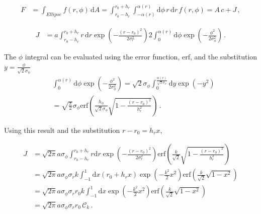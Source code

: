 \documentclass[a4paper]{scrartcl}
\begin{document}
\begin{align}
  F & = \int_{Ellipse} f(r, \phi) \, \mathrm{d}A                                                
    = \int_{r_0 - h_r}^{r_0 + h_r} \int_{-\alpha(r)}^{\alpha(r)} \mathrm{d}\phi \, r \,\mathrm{d}r \, f(r, \phi)
    = A \,c + J \,,
\end{align}

\begin{align}
  J & = a \int_{r_0 - h_r}^{r_0 + h_r} r \,\mathrm{d}r \exp\left( - \frac{(r-r_0)^2}{2 \sigma_r^2} \right)
  2 \int_0^{\alpha(r)} \mathrm{d}\phi \exp\left( - \frac{\phi^2}{2\sigma_\phi^2} \right)   \,.
\end{align}

The $\phi$ integral can be evaluated using the error function, $\mathrm{erf}$, and the substitution
$y = \frac{\phi}{\sqrt{2} \sigma_\phi}$
\begin{align}
   & \int_0^{\alpha(r)} \mathrm{d} \phi \exp\left( - \frac{\phi^2}{2\sigma_\phi^2} \right)
  = \sqrt{2} \sigma_\phi \int_0^{\frac{\alpha(r)}{\sqrt{2} \sigma_\phi}} \mathrm{d}y \exp(-y^2)                                            \\
   & = \sqrt{\frac{\pi}{2}} \sigma_\phi \mathrm{erf} \left( \frac{h_\phi}{\sqrt{2} \sigma_\phi} \sqrt{1 - \frac{(r-r_0)^2}{h_r^2}} \right) \,.
\end{align}

Using this result and the substitution $r - r_0 = h_r x$,

\begin{align}
  J & = \sqrt{2\pi} a \sigma_\phi \int_{r_0 - h_r}^{r_0 + h_r} r \mathrm{d}r \exp\left( - \frac{(r-r_0)^2}{2 \sigma_r^2}\right)
  \mathrm{erf} \left( \frac{k}{\sqrt{2}} \sqrt{1 - \frac{(r-r_0)^2}{h_r^2}} \right)                                             \\
    & = \sqrt{2\pi} a \sigma_\phi \sigma_r k \int_{-1}^{1} \mathrm{d}x (r_0 + h_r x)  \exp\left( - \frac{k^2}{2} x^2\right)
  \mathrm{erf} \left( \frac{k}{\sqrt{2}} \sqrt{1 - x^2} \right)                                                                 \\
    & = \sqrt{2\pi} a \sigma_\phi \sigma_r r_0 k \int_{-1}^{1} \mathrm{d}x \exp\left( - \frac{k^2}{2} x^2\right)
  \mathrm{erf} \left( \frac{k}{\sqrt{2}} \sqrt{1 - x^2} \right)                                                                 \\
    & = \sqrt{2\pi} a \sigma_\phi \sigma_r r_0 \, \mathcal{C}_k \,.
\end{align}
\end{document}
